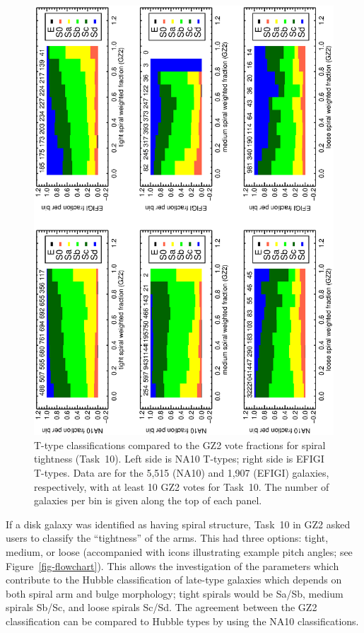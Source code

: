 \documentclass[useAMS,usenatbib]{mn2e}
\begin{document}
\begin{figure}
\includegraphics[angle=-90,width=7.0in]{figures/spiraltightness_color.ps}
\caption{T-type classifications compared to the GZ2 vote fractions for spiral tightness (Task~10). Left side is NA10 T-types; right side is EFIGI T-types. Data are for the 5,515 (NA10) and 1,907 (EFIGI) galaxies, respectively, with at least 10 GZ2 votes for Task~10. The number of galaxies per bin is given along the top of each panel. 
\label{fig-spiraltightness}}
\end{figure}

If a disk galaxy was identified as having spiral structure, Task~10 in GZ2 asked users to classify the ``tightness'' of the arms. This had three options: tight, medium, or loose (accompanied with icons illustrating example pitch angles; see Figure~\ref{fig-flowchart}). This allows the investigation of the parameters which contribute to the Hubble classification of late-type galaxies which depends on both spiral arm and bulge morphology; tight spirals would be Sa/Sb, medium spirals Sb/Sc, and loose spirals Sc/Sd. The agreement between the GZ2 classification can be compared to Hubble types by using the NA10 classifications. 
\end{document}
